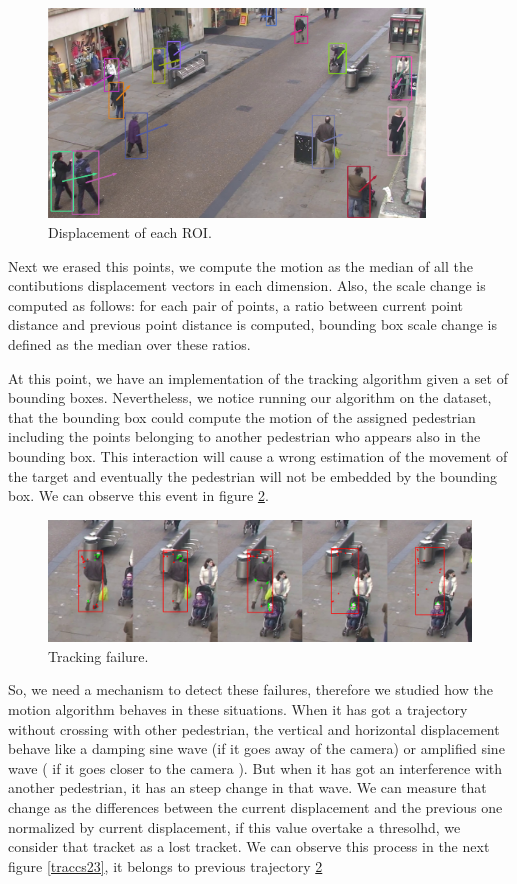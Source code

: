 \begin{figure}[H]
\centering         
\includegraphics[width=10cm]{intro/alcover2.png}
\caption{Displacement of each ROI.} \label{solution5}
\end{figure}



Next we erased this points, we compute the motion as the median of all the contibutions displacement vectors in each dimension. Also, the scale change is computed as follows: for each pair of points, a ratio between current point distance and previous point distance is computed, bounding box scale change is defined as the median over these ratios. 

At this point, we have an implementation of the tracking algorithm given a set of bounding boxes. Nevertheless, we notice running our algorithm on the dataset, that the bounding box could compute the motion of the assigned pedestrian including the points belonging to another pedestrian who appears also in the bounding box. This interaction will cause a wrong estimation of the movement of the target and eventually the pedestrian will not be embedded by the bounding box. We can observe this event in figure \ref{traccs}.


\begin{figure}[H]
\centering         
\includegraphics[width=0.9\linewidth]{velocidadas/mateuPont.png}
\caption{Tracking failure.} \label{traccs}
\end{figure}


So, we need a mechanism to detect these failures, therefore we studied how the motion algorithm behaves in these situations. When it has got a trajectory without crossing with other pedestrian, the vertical and horizontal displacement behave like a damping sine wave (if it goes away of the camera)  or amplified sine wave ( if it goes closer to the camera ). But when it has got an interference with another pedestrian, it has an steep change in that wave. We can measure that change as the differences between the current displacement and the previous one normalized by current displacement, if this value overtake a thresolhd, we consider that tracket as a lost tracket. We can observe this process in the next figure \ref{traccs23}, it belongs to previous trajectory \ref{traccs} 


